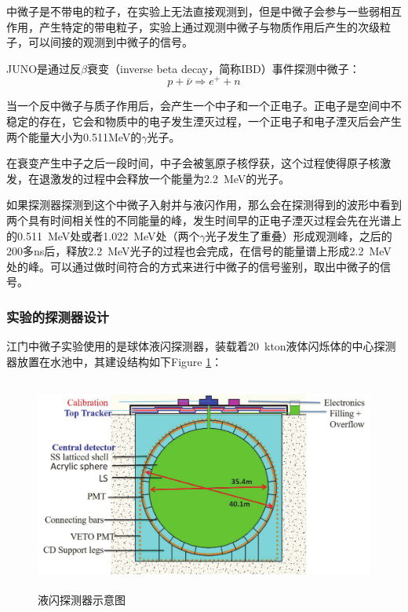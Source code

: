 \documentclass[10pt,a4paper]{article}
\begin{document}
中微子是不带电的粒子，在实验上无法直接观测到，但是中微子会参与一些弱相互作用，产生特定的带电粒子，实验上通过观测中微子与物质作用后产生的次级粒子，可以间接的观测到中微子的信号。

JUNO是通过反$\beta$衰变（inverse beta decay，简称IBD）事件探测中微子：$$p+\bar{\nu}\Rightarrow e^{+}+n$$

当一个反中微子与质子作用后，会产生一个中子和一个正电子。正电子是空间中不稳定的存在，它会和物质中的电子发生湮灭过程，一个正电子和电子湮灭后会产生两个能量大小为0.511MeV的$\gamma$光子。

在衰变产生中子之后一段时间，中子会被氢原子核俘获，这个过程使得原子核激发，在退激发的过程中会释放一个能量为\SI{2.2}{MeV}的光子。


如果探测器探测到这个中微子入射并与液闪作用，那么会在探测得到的波形中看到两个具有时间相关性的不同能量的峰，发生时间早的正电子湮灭过程会先在光谱上的\SI{0.511}{MeV}处或者\SI{1.022}{MeV}处（两个$\gamma$光子发生了重叠）形成观测峰，之后的200多ns后，释放\SI{2.2}{MeV}光子的过程也会完成，在信号的能量谱上形成\SI{2.2}{MeV}处的峰。可以通过做时间符合的方式来进行中微子的信号鉴别，取出中微子的信号。

\subsubsection{实验的探测器设计}\label{sub:7}

江门中微子实验使用的是球体液闪探测器，装载着\SI{20}{kton}液体闪烁体的中心探测器放置在水池中，其建设结构如下Figure \ref{fig:3}：\cite{Ludhova:2020vxz}
\begin{figure}[H]
 \centering
 \includegraphics[height=7cm]{images/探测器示意图.png}
 \caption{液闪探测器示意图}
 \label{fig:3}
\end{figure}
\end{document}
